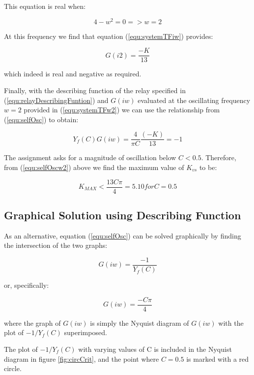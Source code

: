 \documentclass[a4paper, titlepage]{article}
\begin{document}
This equation is real when:

\begin{equation}
4-w^2 = 0 => w=2
\label{equ:systemTFreal}
\end{equation}

At this frequency we find that equation (\ref{equ:systemTFiw}) provides:

\begin{equation}
G(i2) = \frac{-K}{13}
\label{equ:systemTFw2}
\end{equation}

which indeed is real and negative as required.

Finally, with the describing function of the relay specified in  (\ref{equ:relayDescribingFuntion}) and $G(iw)$ evaluated at the oscillating frequency $w=2$ provided in (\ref{equ:systemTFw2}) we can use the relationship from (\ref{equ:selfOsc}) to obtain:

\begin{equation}
Y_{f}(C)G(iw) = \frac{4}{\pi C}\frac{(-K)}{13} = -1
\label{equ:selfOscw2}
\end{equation}

The assignment asks for a magnitude of oscillation below $C < 0.5$.
Therefore, from (\ref{equ:selfOscw2}) above we find the maximum value of $K_{vs}$ to be:

\begin{equation}
K_{MAX} < \frac{13C\pi}{4} = 5.10 for C=0.5
\label{equ:maximum_k}
\end{equation}

\subsection{Graphical Solution using Describing Function}

As an alternative, equation (\ref{equ:selfOsc}) can be solved graphically by finding the intersection of the two graphs:

\begin{equation}
G(iw) = \frac{-1}{Y_{f}(C)}
\end{equation}

or, specifically:

\begin{equation}
G(iw) = \frac{-C\pi}{4}
\end{equation}

where the graph of $G(iw)$ is simply the Nyquist diagram of $G(iw)$ with the plot of $-1/Y_{f}(C)$ superimposed.

The plot of $-1/Y_{f}(C)$ with varying values of C is included in the Nyquist diagram in figure \ref{fig:circCrit}, and the point where $C=0.5$ is marked with a red circle.
\end{document}
